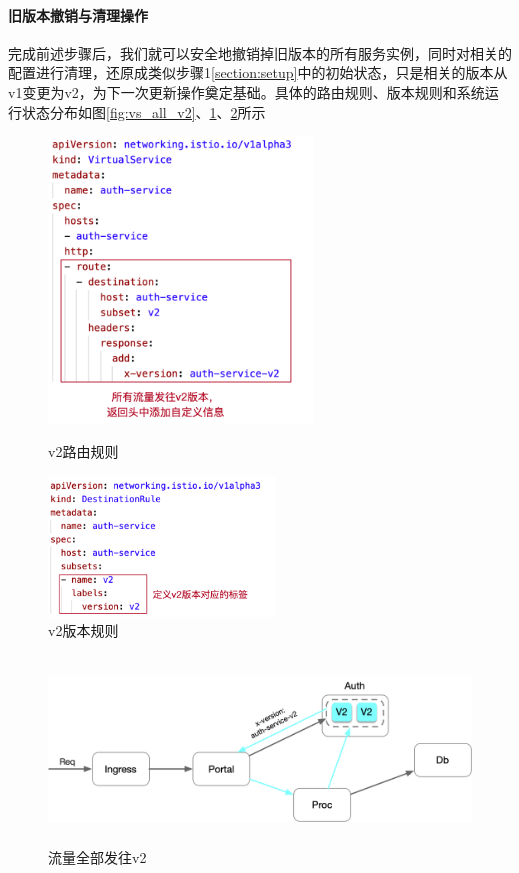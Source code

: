 \documentclass[a4paper, 12pt]{article}
\theoremstyle{definition}
\begin{document}
\paragraph{旧版本撤销与清理操作}
完成前述步骤后，我们就可以安全地撤销掉旧版本的所有服务实例，同时对相关的配置进行清理，还原成类似步骤1\ref{section:setup}中的初始状态，只是相关的版本从v1变更为v2，为下一次更新操作奠定基础。具体的路由规则、版本规则和系统运行状态分布如图\ref{fig:vs_all_v2}、\ref{fig:dr_v2}、\ref{fig:traffic_all_v2}所示
\begin{figure}[h]
\centering
\begin{minipage}[t]{0.48\textwidth}
\centering
\centerline{\includegraphics[width=7cm]{vs_all_v2.png}}
\caption{v2路由规则}
\label{fig:vs_all_v2}
\end{minipage}
\begin{minipage}[t]{0.48\textwidth}
\centering
\centerline{\includegraphics[width=6cm]{dr_v2.png}}
\caption{v2版本规则}
\label{fig:dr_v2}
\end{minipage}
\end{figure}
\begin{figure}[ht]
 \centering
 \includegraphics[height=5cm]{images/traffic_all_v2.png}
 \caption{流量全部发往v2}
 \label{fig:traffic_all_v2}
\end{figure}
\end{document}
